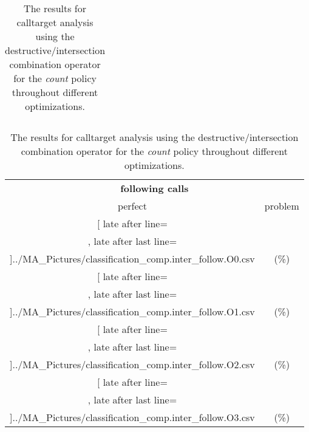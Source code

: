 \begin{table}[!htbp]
{\begin{tabular}{l|c|c|c}
    	\end{tabular}

	\begin{tabular}{|c|c}%

	\toprule
    \multicolumn{2}{c}{\bfseries following calls}\\
	
	     perfect &  problem %
	\\\midrule
	\csvreader[ late after line=\\, late after last line=\\\midrule]{../MA_Pictures/classification_comp.inter_follow.O0.csv}{
}
	{\csvcolxiii (\csvcolxiv \%) & \csvcolxv (\csvcolxvi \%)}%
\multicolumn{1}{c}{}

	\\\midrule
	\csvreader[ late after line=\\, late after last line=\\\midrule]{../MA_Pictures/classification_comp.inter_follow.O1.csv}{
}
	{\csvcolxiii (\csvcolxiv \%) & \csvcolxv (\csvcolxvi \%)}%
	
	\multicolumn{1}{c}{}

	\\\midrule
	\csvreader[ late after line=\\, late after last line=\\\midrule]{../MA_Pictures/classification_comp.inter_follow.O2.csv}{
}
	{\csvcolxiii (\csvcolxiv \%) & \csvcolxv (\csvcolxvi \%)}%
	
\multicolumn{1}{c}{}
	\\\midrule
	\csvreader[ late after line=\\, late after last line=\\\bottomrule]{../MA_Pictures/classification_comp.inter_follow.O3.csv}{
}
	{\csvcolxiii (\csvcolxiv \%) & \csvcolxv (\csvcolxvi \%)}%


    	\end{tabular}
}
		\caption {The results for calltarget analysis using the destructive/intersection combination operator for the \textit{count} policy throughout different optimizations.}
		\label{tbl:CTdestinterCOUNT}
\end{table}


